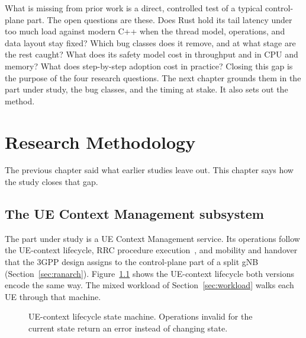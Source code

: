 \documentclass[english,oneside,a4paper,censored,csm,software-track-2020]{HYthesisML}
\begin{document}
What is missing from prior work is a direct, controlled test of a typical
control-plane part. The open questions are these. Does Rust hold its tail
latency under too much load against modern C++ when the thread model, operations, and
data layout stay fixed? Which bug classes does it remove, and at what stage
are the rest caught? What does its safety model cost in throughput and in CPU
and memory? What does step-by-step adoption cost in practice? Closing this gap
is the purpose of the four research questions. The next chapter grounds them
in the part under study, the bug classes, and the timing at stake. It also
sets out the method.


\chapter{Research Methodology\label{chapter:methodology}}

The previous chapter said what earlier studies leave out. This chapter says how the study closes that gap.

\section{The UE Context Management subsystem}\label{sec:uecm}
The part under study is a UE Context Management service. Its operations follow the
UE-context lifecycle, RRC procedure execution~\cite{3gpp38331}, and mobility and
handover that the 3GPP design assigns to the control-plane part of a split gNB
(Section~\ref{sec:ranarch}). Figure~\ref{fig:fsm} shows the UE-context
lifecycle both versions encode the same way. The mixed workload of
Section~\ref{sec:workload} walks each UE through that machine.

\begin{figure}[ht]
\centering
{}
\caption[UE-context lifecycle state machine]{UE-context lifecycle state machine.
Operations invalid for the current state return an error instead of changing
state.\label{fig:fsm}}
\end{figure}
\end{document}
